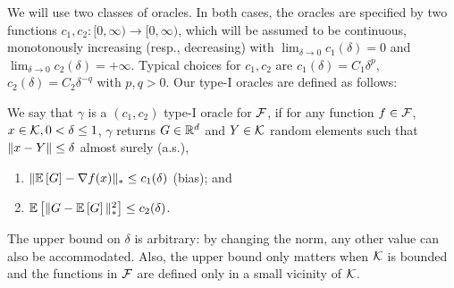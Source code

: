 We will use two classes of oracles. In both cases, the oracles are specified by
two functions $c_1,c_2:[0,\infty)\to [0,\infty)$, which will be assumed to be continuous,
monotonously increasing (resp., decreasing) with
$\lim_{\delta\to  0} c_1(\delta)=0$ and $\lim_{\delta\to 0} c_2(\delta)=+\infty$.
Typical choices for $c_1,c_2$ are $c_1(\delta) = C_1 \delta^p$, $c_2(\delta) = C_2\delta^{-q}$ with $p,q>0$.
Our type-I oracles are defined as follows:
\vspace{-0.2cm}
\begin{definition}
\label{def:oracle1}
We say that $\gamma$ is a  $(c_1,c_2)$ type-I oracle for $\mathcal{F}$, if for any function $f\in \mathcal{F}$,
$x\in \mathcal{K},0<\delta\le 1$, $\gamma$ returns $G\in \mathbb{R}^d$ and  $Y\in \mathcal{K}$ random elements such that
$\|x-Y\|\le \delta$ almost surely (a.s.),
\vspace{-0.2cm}
\begin{enumerate}
\item $\| \mathbb{E}\left[G\right]  - \nabla f(x)  \|_* \le c_1(\delta) $ (bias); and
\item $\mathbb{E}\left[\| G -  \mathbb{E}\left[G\right] \|_*^2\right] \le c_2(\delta)$.
\end{enumerate}
\vspace{-0.1cm}
\end{definition}
The upper bound on $\delta$ is arbitrary: by changing the norm, any other value can also be accommodated. Also, the upper bound only matters when $\mathcal{K}$ is bounded and the functions in $\mathcal{F}$ are defined only in a small vicinity of $\mathcal{K}$.

